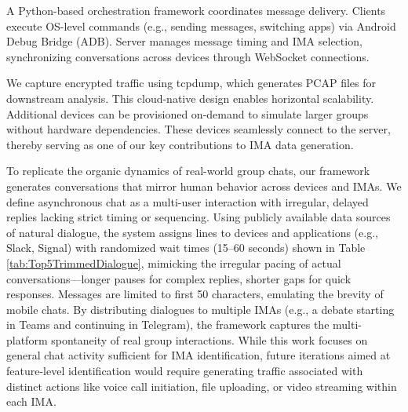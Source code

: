 \documentclass[conference]{IEEEtran}
\begin{document}
A Python-based orchestration framework coordinates message delivery. Clients execute OS-level commands (e.g., sending messages, switching apps) via Android Debug Bridge (ADB). Server manages message timing and IMA selection, synchronizing conversations across devices through WebSocket connections.

We capture encrypted traffic using tcpdump, which generates PCAP files for downstream analysis. This cloud-native design enables horizontal scalability. Additional devices can be provisioned on-demand to simulate larger groups without hardware dependencies. These devices seamlessly connect to the server, thereby serving as one of our key contributions to IMA data generation.

To replicate the organic dynamics of real-world group chats, our framework generates conversations that mirror human behavior across devices and IMAs. We define asynchronous chat as a multi-user interaction with irregular, delayed replies lacking strict timing or sequencing. Using publicly available data sources of natural dialogue, the system assigns lines to devices and applications (e.g., Slack, Signal) with randomized wait times (15–60 seconds) shown in Table \ref{tab:Top5TrimmedDialogue}, mimicking the irregular pacing of actual conversations—longer pauses for complex replies, shorter gaps for quick responses. Messages are limited to first 50 characters, emulating the brevity of mobile chats. By distributing dialogues to multiple IMAs (e.g., a debate starting in Teams and continuing in Telegram), the framework captures the multi-platform spontaneity of real group interactions. While this work focuses on general chat activity sufficient for IMA identification, future iterations aimed at feature-level identification would require generating traffic associated with distinct actions like voice call initiation, file uploading, or video streaming within each IMA.
\end{document}
